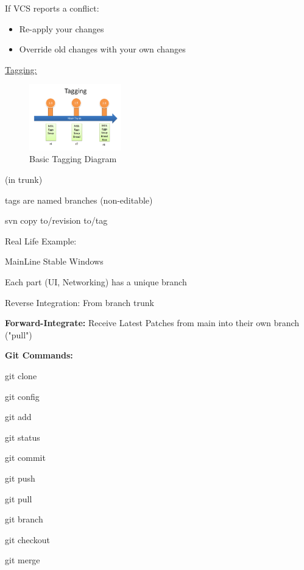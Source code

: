 \documentclass{article}
\begin{document}
\begin{flushleft}
If VCS reports a conflict: \\
\par

\begin{itemize}
    \item Re-apply your changes
    \item Override old changes with your own changes
\end{itemize} \par
\par

\underline{Tagging:} \\
\par


\begin{figure}[htp]
\centering
\includegraphics[width=4cm]{Tagging.png}
\caption{Basic Tagging Diagram}
\label{fig:BTDiagram}
\end{figure} 

(in trunk) \par
tags are named branches (non-editable) \par
svn copy to/revision to/tag \\
\par

Real Life Example: \par
MainLine \rightarrow Stable Windows \par
Each part (UI, Networking) has a unique branch \par

Reverse Integration: From branch \rightarrow trunk \\
\par

\textbf{Forward-Integrate:} Receive Latest Patches from main into their own branch ("pull") \\
\par

\textbf{Git Commands:} \\
\par

git clone \par
git config \par
git add \par
git status \par
git commit \par
git push \par
git pull \par
git branch \par
git checkout \par
git merge \\
\par


\end{flushleft}
\end{document}

